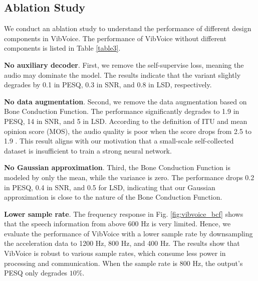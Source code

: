 \subsection{Ablation Study}
We conduct an ablation study to understand the performance of different design components in VibVoice. The performance of VibVoice without different components is listed in Table \ref{table3}.

\noindent\textbf{No auxiliary decoder}. First, we remove the self-supervise loss, meaning the audio may dominate the model. The results indicate that the variant slightly degrades by 0.1 in PESQ, 0.3 in SNR, and 0.8 in LSD, respectively.

\noindent\textbf{No data augmentation}.
Second, we remove the data augmentation based on Bone Conduction Function. The performance significantly degrades to 1.9 in PESQ, 14 in SNR, and 5 in LSD. According to the definition of ITU and mean opinion score (MOS), the audio quality is poor when the score drops from 2.5 to 1.9 \citep{Perceptu66:online}. This result aligns with our motivation that a small-scale self-collected dataset is insufficient to train a strong neural network.

\noindent\textbf{No Gaussian approximation}.
Third, the Bone Conduction Function is modeled by only the mean, while the variance is zero. The performance drops 0.2 in PESQ, 0.4 in SNR, and 0.5 for LSD, indicating that our Gaussian approximation is close to the nature of the Bone Conduction Function.

\noindent\textbf{Lower sample rate}.
The frequency response in Fig. \ref{fig:vibvoice_bcf} shows that the speech information from above 600 Hz is very limited. Hence, we evaluate the performance of VibVoice with a lower sample rate by downsampling the acceleration data to 1200 Hz, 800 Hz, and 400 Hz. The results show that VibVoice is robust to various sample rates, which consume less power in processing and communication. When the sample rate is 800 Hz, the output's PESQ only degrades $10\%$.

